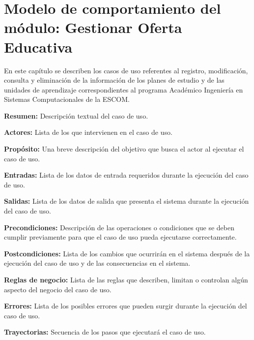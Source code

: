 \newpage

\section{Modelo de comportamiento del módulo: Gestionar Oferta Educativa
\label{chp:gestionarInterfe}}

En este capítulo se describen los casos de uso referentes al registro, modificación, consulta y eliminación de la información de los planes de estudio y de las unidades de aprendizaje correspondientes al programa Académico Ingeniería en Sistemas Computacionales de la ESCOM. \bigskip

     \begin{objetivos}
	\item {\bf Resumen:} Descripción textual del caso de uso.
	\item {\bf Actores:} Lista de los 
	 que intervienen en el caso de uso.
	\item {\bf Propósito:} Una breve descripción del objetivo que busca el actor al ejecutar el caso de uso.
	\item {\bf Entradas:} Lista de los datos de entrada requeridos durante la ejecución del caso de uso.
	\item {\bf Salidas:} Lista de los datos de salida que presenta el sistema durante la ejecución del caso de uso.
	\item {\bf Precondiciones:} Descripción de las operaciones o condiciones que se deben cumplir previamente para que el caso de uso pueda ejecutarse correctamente.
	\item {\bf Postcondiciones:} Lista de los cambios que ocurrirán en el sistema después de la ejecución del caso de uso y de las consecuencias en el sistema.
	\item {\bf Reglas de negocio:} Lista de las reglas que describen, limitan o controlan algún aspecto del negocio del caso de uso.
	\item {\bf Errores:} Lista de los posibles errores que pueden surgir durante la ejecución del caso de uso.
	\item {\bf Trayectorias:} Secuencia de los pasos que ejecutará el caso de uso.
    \end{objetivos}

	
	

